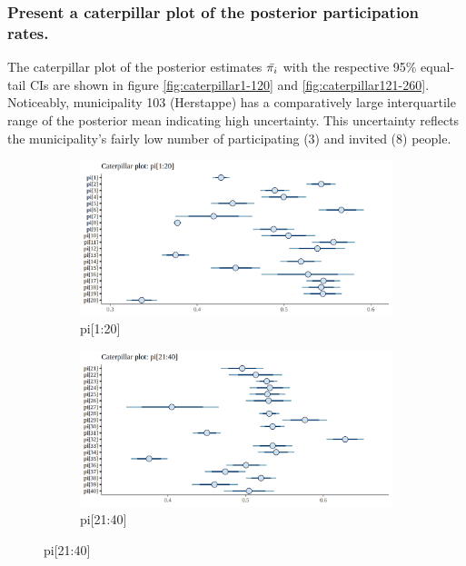 \documentclass[12pt]{article}
\begin{document}
\subsubsection{Present a caterpillar plot of the posterior participation rates.}

The caterpillar plot of the posterior estimates $\Bar{\pi_i}$ with the respective 95\% equal-tail CIs are shown in figure \ref{fig:caterpillar1-120} and \ref{fig:caterpillar121-260}. Noticeably, municipality 103 (Herstappe) has a comparatively large interquartile range of the posterior mean indicating high uncertainty. This uncertainty reflects the municipality's fairly low number of participating (3) and invited (8) people. 


\begin{figure}[h!]
    \centering
    \begin{subfigure}{0.45\textwidth}
        \includegraphics[width=\linewidth]{pictures/cater1-20.png}
        \caption{pi[1:20]}
        \label{fig:sub1_1}
    \end{subfigure}
    \begin{subfigure}{0.45\textwidth}
        \includegraphics[width=\linewidth]{pictures/cater21-40.png}
        \caption{pi[21:40]}
        \label{fig:sub1_2}
    \end{subfigure}


\end{figure}
\end{document}
